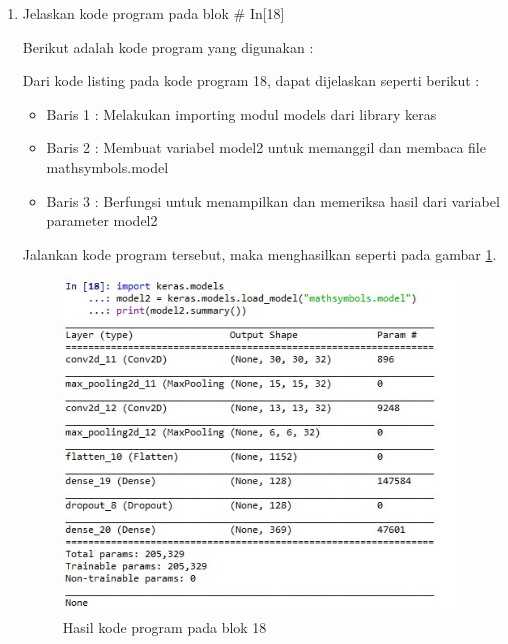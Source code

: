 \begin{enumerate}
\item Jelaskan kode program pada blok \# In[18]
	\par Berikut adalah kode program yang digunakan :
	
	\par Dari kode listing pada kode program 18, dapat dijelaskan seperti berikut :
	\begin{itemize}
	\item Baris 1	: Melakukan importing modul models dari library keras
	\item Baris 2	: Membuat variabel model2 untuk memanggil dan membaca file mathsymbols.model
	\item Baris 3	: Berfungsi untuk menampilkan dan memeriksa hasil dari variabel parameter model2
	\end{itemize}
	\par Jalankan kode program tersebut, maka menghasilkan seperti pada gambar \ref{andri18}.
		\begin{figure}[!hbtp]
		\centering
		\includegraphics[scale=0.5]{figures/chapter7/andri18.jpg}
		\caption{Hasil kode program pada blok 18}
		\label{andri18}
		\end{figure}


\end{enumerate}
